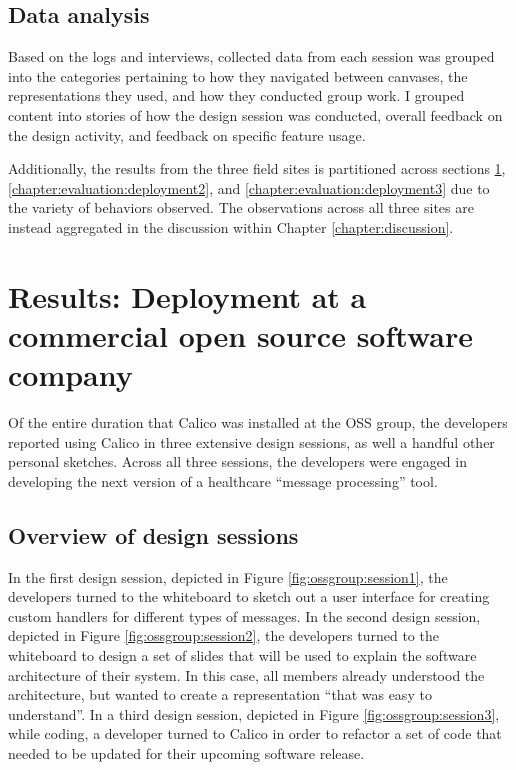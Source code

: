 \subsection{Data analysis}

Based on the logs and interviews, collected data from each session was grouped into the categories pertaining to how they navigated between canvases, the representations they used, and how they conducted group work.  I grouped content into stories of how the design session was conducted, overall feedback on the design activity, and feedback on specific feature usage. 

Additionally, the results from the three field sites is partitioned across sections \ref{chapter:evaluation:deployment1}, \ref{chapter:evaluation:deployment2}, and \ref{chapter:evaluation:deployment3} due to the variety of behaviors observed. The observations across all three sites are instead aggregated in the discussion within Chapter \ref{chapter:discussion}.

\section{Results: Deployment at a commercial open source software company}
\label{chapter:evaluation:deployment1}

Of the entire duration that Calico was installed at the OSS group, the developers reported using Calico in three extensive design sessions, as well a handful other personal sketches. Across all three sessions, the developers were engaged in developing the next version of a healthcare ``message processing'' tool. 

\subsection{Overview of design sessions}

In the first design session, depicted in Figure \ref{fig:ossgroup:session1}, the developers turned to the whiteboard to sketch out a user interface for creating custom handlers for different types of messages. In the second design session, depicted in Figure \ref{fig:ossgroup:session2}, the developers turned to the whiteboard to design a set of slides that will be used to explain the software architecture of their system. In this case, all members already understood the architecture, but wanted to create a representation ``that was easy to understand''. In a third design session, depicted in Figure \ref{fig:ossgroup:session3}, while coding, a developer turned to Calico in order to refactor a set of code that needed to be updated for their upcoming software release.

